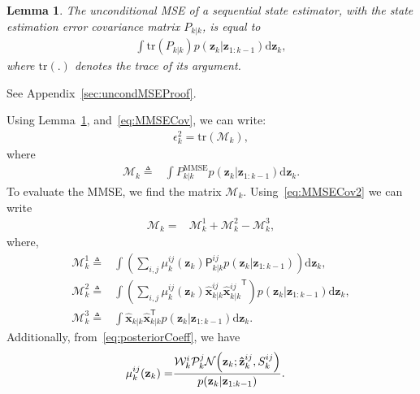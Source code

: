 \documentclass[10pt,twocolumn,twoside]{IEEEtran}
\newtheorem{lem}{Lemma}
\newcommand{\tran}{^{\mathsf{T}}}
\newcommand{\Pmmse}{P_{k|k}^{\mathrm{MMSE}}}
\newcommand{\corcol}[1]{\textcolor{CorCol}{#1}}
\begin{document}
\begin{lem}
\label{lemma:uncondMSE}
The unconditional MSE of a sequential state estimator, with the state estimation error covariance matrix \(P_{k|k}\), is equal to
\begin{align}
\label{eq:simplifiedUnconditionalMSE}
\int \mathrm{tr}{\left(P_{k|k}\right)}p{\left(\mathbf{{z}}_{k}|\mathbf{{z}}_{1:k-1}\right)} \mathrm{d}\mathbf{{z}}_{k},
\end{align}
where \(\mathrm{tr} {\left(.\right)}\) denotes the trace of its argument.
\end{lem}
\begin{IEEEproof}
See Appendix~\ref{sec:uncondMSEProof}.
\end{IEEEproof}
Using Lemma~\ref{lemma:uncondMSE}, and~\eqref{eq:MMSECov}, we can write:
\begin{align}
\label{eq:defMMSE}
\epsilon_k ^2 = \mathrm{tr}\left({\mathcal{M}_k}\right),
\end{align}
where
\begin{align}
\label{eq:defM}
\mathcal{M}_k \triangleq & \int \Pmmse p{\left(\mathbf{{z}}_{k}|\mathbf{{z}}_{1:k-1}\right)} \mathrm{d}\mathbf{{z}}_{k}.
\end{align} 
To evaluate the MMSE, we find the matrix \(\mathcal{M}_k\). Using~\eqref{eq:MMSECov2} we can write
\begin{align}
\label{eq:decomposeM}
\mathcal{M}_k =& \mathcal{M}_k^1+\mathcal{M}_k^2-\mathcal{M}_k^3,
\end{align}
where,
\begin{align}
\label{eq:defM1}
\mathcal{M}_k^1 \triangleq & \int \left(\sum \limits _{i,j}\mu_{k}^{ij}{\left(\mathbf{z}_{k}\right)}\mathsf{P}_{k|k}^{ij}p{\left(\mathbf{{z}}_{k}|\mathbf{{z}}_{1:k-1}\right)}\right) \mathrm{d}\mathbf{{z}}_{k} ,
\\ \label{eq:defM2}
\mathcal{M}_k^2 \triangleq & \int \left( \sum \limits _{i,j}\mu_{k}^{ij}{\left(\mathbf{z}_{k}\right)} \mathsf{\hat{\boldsymbol{x}}}_{k|k}^{ij} \mathsf{\hat{\boldsymbol{x}}}{_{k|k}^{ij}}\tran \right) p{\left(\mathbf{{z}}_{k}|\mathbf{{z}}_{1:k-1}\right)} \mathrm{d}\mathbf{{z}}_{k},\\ \label{eq:defM3}
\mathcal{M}_k^3 \triangleq & \int  \mathsf{\hat{\boldsymbol{x}}}_{k|k}\mathsf{\hat{\boldsymbol{x}}}_{k|k}\tran p{\left(\mathbf{{z}}_{k}|\mathbf{{z}}_{1:k-1}\right)} \mathrm{d}\mathbf{{z}}_{k}.
\end{align}
Additionally, from~\eqref{eq:posteriorCoeff}, we have
\begin{align}
\label{eq:muijOtherForm}
\mu_{k}^{ij}{\left(\mathbf{z}_{k}\right)} = & \frac{\corcol{\mathcal{W}^i_k\mathcal{P}^j_k}\mathcal{N}{\left(\mathbf{z}_k; \mathbf{\hat{z}}_{k}^{ij}, S_k^{ij}\right)}}{p{\left(\mathbf{{z}}_{k}|\mathbf{{z}}_{1:k-1}\right)}}.
\end{align}
\end{document}

